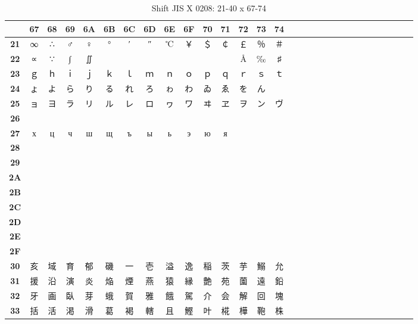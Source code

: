 \begin{table}[H]
\centering
\caption{Shift JIS X 0208: 21-40 x 67-74}
\begin{tabular}{|Sc|Sc|Sc|Sc|Sc|Sc|Sc|Sc|Sc|Sc|Sc|Sc|Sc|Sc|Sc|}
\hline
 & \textbf{67} & \textbf{68} & \textbf{69} & \textbf{6A} & \textbf{6B} & \textbf{6C} & \textbf{6D} & \textbf{6E} & \textbf{6F} & \textbf{70} & \textbf{71} & \textbf{72} & \textbf{73} & \textbf{74} \\ \hline
\textbf{21} & ∞ & ∴ & ♂ & ♀ & ° & ′ & ″ & ℃ & ￥ & ＄ & ￠ & ￡ & ％ & ＃ \\ \hline
\textbf{22} & ∝ & ∵ & ∫ & ∬ &   &   &   &   &   &   &   & Å & ‰ & ♯ \\ \hline
\textbf{23} & ｇ & ｈ & ｉ & ｊ & ｋ & ｌ & ｍ & ｎ & ｏ & ｐ & ｑ & ｒ & ｓ & ｔ \\ \hline
\textbf{24} & ょ & よ & ら & り & る & れ & ろ & ゎ & わ & ゐ & ゑ & を & ん &   \\ \hline
\textbf{25} & ョ & ヨ & ラ & リ & ル & レ & ロ & ヮ & ワ & ヰ & ヱ & ヲ & ン & ヴ \\ \hline
\textbf{26} &  &  &  &  &  &  &  &  &  &  &  &  &  &  \\ \hline
\textbf{27} & х & ц & ч & ш & щ & ъ & ы & ь & э & ю & я &   &   &   \\ \hline
\textbf{28} &  &  &  &  &  &  &  &  &  &  &  &  &  &  \\ \hline
\textbf{29} &  &  &  &  &  &  &  &  &  &  &  &  &  &  \\ \hline
\textbf{2A} &  &  &  &  &  &  &  &  &  &  &  &  &  &  \\ \hline
\textbf{2B} &  &  &  &  &  &  &  &  &  &  &  &  &  &  \\ \hline
\textbf{2C} &  &  &  &  &  &  &  &  &  &  &  &  &  &  \\ \hline
\textbf{2D} &  &  &  &  &  &  &  &  &  &  &  &  &  &  \\ \hline
\textbf{2E} &  &  &  &  &  &  &  &  &  &  &  &  &  &  \\ \hline
\textbf{2F} &  &  &  &  &  &  &  &  &  &  &  &  &  &  \\ \hline
\textbf{30} & 亥 & 域 & 育 & 郁 & 磯 & 一 & 壱 & 溢 & 逸 & 稲 & 茨 & 芋 & 鰯 & 允 \\ \hline
\textbf{31} & 援 & 沿 & 演 & 炎 & 焔 & 煙 & 燕 & 猿 & 縁 & 艶 & 苑 & 薗 & 遠 & 鉛 \\ \hline
\textbf{32} & 牙 & 画 & 臥 & 芽 & 蛾 & 賀 & 雅 & 餓 & 駕 & 介 & 会 & 解 & 回 & 塊 \\ \hline
\textbf{33} & 括 & 活 & 渇 & 滑 & 葛 & 褐 & 轄 & 且 & 鰹 & 叶 & 椛 & 樺 & 鞄 & 株 \\ \hline

\end{tabular}
\end{table}

